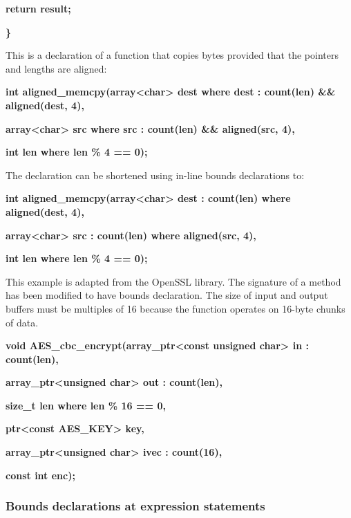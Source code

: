 \documentclass[]{article}
\begin{document}
\textbf{return result;}

\textbf{\}}

This is a declaration of a function that copies bytes provided that the
pointers and lengths are aligned:

\textbf{int aligned\_memcpy(array\textless{}char\textgreater{} dest
where dest : count(len) \&\& aligned(dest, 4),}

\textbf{array\textless{}char\textgreater{} src where src : count(len)
\&\& aligned(src, 4),}

\textbf{int len where len \% 4 == 0);}

The declaration can be shortened using in-line bounds declarations to:

\textbf{int aligned\_memcpy(array\textless{}char\textgreater{} dest :
count(len) where aligned(dest, 4),}

\textbf{array\textless{}char\textgreater{} src : count(len) where
aligned(src, 4),}

\textbf{int len where len \% 4 == 0);}

This example is adapted from the OpenSSL library. The signature of a
method has been modified to have bounds declaration. The size of input
and output buffers must be multiples of 16 because the function operates
on 16-byte chunks of data.

\textbf{void AES\_cbc\_encrypt(array\_ptr\textless{}const unsigned
char\textgreater{} in : count(len),}

\textbf{array\_ptr\textless{}unsigned char\textgreater{} out :
count(len),}

\textbf{size\_t len where len \% 16 == 0,}

\textbf{ptr\textless{}const AES\_KEY\textgreater{} key,}

\textbf{array\_ptr\textless{}unsigned char\textgreater{} ivec :
count(16),}

\textbf{const int enc);}

\subsubsection{\texorpdfstring{\protect\hypertarget{ux5fRef434850583}{}{\protect\hypertarget{ux5fToc435434930}{}{\protect\hypertarget{ux5fToc437460751}{}{\protect\hypertarget{ux5fToc440445429}{}{\protect\hypertarget{ux5fToc440449211}{}{\protect\hypertarget{ux5fToc440551861}{}{}}}}}}Bounds
declarations at expression
statements}{Bounds declarations at expression statements}}\label{bounds-declarations-at-expression-statements}
\end{document}
